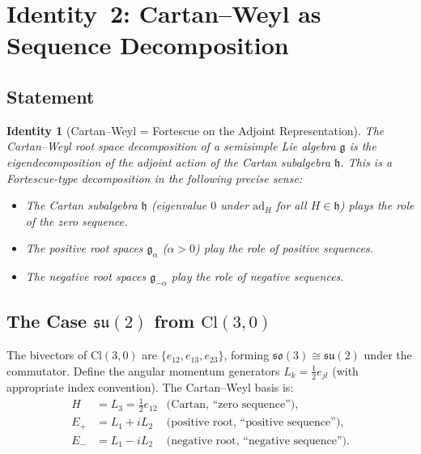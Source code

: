\documentclass[11pt]{article}
\newtheorem{identity}[theorem]{Identity}
\newcommand{\so}{\mathfrak{so}}
\newcommand{\su}{\mathfrak{su}}
\newcommand{\g}{\mathfrak{g}}
\newcommand{\h}{\mathfrak{h}}
\newcommand{\Cl}{\mathrm{Cl}}
\newcommand{\ad}{\mathrm{ad}}
\begin{document}
\section{Identity~2: Cartan--Weyl as Sequence Decomposition}
\label{sec:cartan-weyl-fortescue}

\subsection{Statement}

\begin{identity}[Cartan--Weyl = Fortescue on the Adjoint Representation]
\label{id:cartan-weyl-fortescue}
The Cartan--Weyl root space decomposition of a semisimple Lie algebra
$\g$ is the eigendecomposition of the adjoint action of the Cartan
subalgebra $\h$. This is a Fortescue-type decomposition in the
following precise sense:
\begin{itemize}[leftmargin=*]
\item The Cartan subalgebra $\h$ (eigenvalue $0$ under $\ad_H$ for all
  $H \in \h$) plays the role of the \emph{zero sequence}.
\item The positive root spaces $\g_\alpha$ ($\alpha > 0$) play the role
  of \emph{positive sequences}.
\item The negative root spaces $\g_{-\alpha}$ play the role of
  \emph{negative sequences}.
\end{itemize}
\end{identity}

\subsection{The Case $\su(2)$ from $\Cl(3,0)$}

The bivectors of $\Cl(3,0)$ are $\{e_{12}, e_{13}, e_{23}\}$, forming
$\so(3) \cong \su(2)$ under the commutator. Define the angular momentum
generators $L_k = \frac{1}{2} e_{jl}$ (with appropriate index
convention). The Cartan--Weyl basis is:
\begin{align}
  H &= L_3 = \tfrac{1}{2} e_{12}
    &\text{(Cartan, ``zero sequence'')}, \nonumber \\
  E_+ &= L_1 + i L_2
    &\text{(positive root, ``positive sequence'')}, \label{eq:su2-cw} \\
  E_- &= L_1 - i L_2
    &\text{(negative root, ``negative sequence'')}. \nonumber
\end{align}
\end{document}
